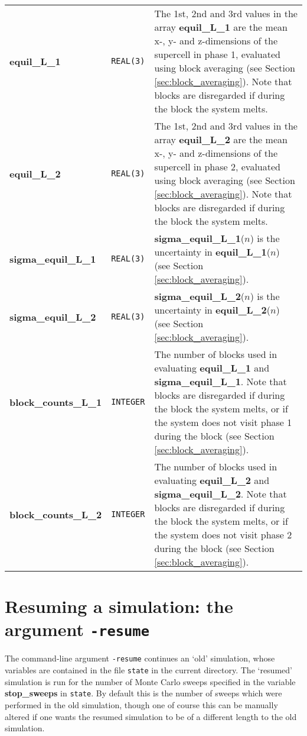 \documentclass{report}
\begin{document}
\begin{landscape}
\begin{center}
\begin{longtable}{ l l p{8cm}}
\textbf{equil\_L\_1} & \texttt{REAL(3)} & The 1st, 2nd and 3rd values in the array \textbf{equil\_L\_1} are the mean x-, y- and z-dimensions of the
supercell in phase 1, evaluated using block averaging (see Section \ref{sec:block_averaging}). Note that blocks are disregarded if during the block the system melts. \\
\textbf{equil\_L\_2} & \texttt{REAL(3)} &  The 1st, 2nd and 3rd values in the array \textbf{equil\_L\_2} are the mean x-, y- and z-dimensions of the
supercell in phase 2, evaluated using block averaging (see Section \ref{sec:block_averaging}). Note that blocks are disregarded if during the block the system melts. \\
\textbf{sigma\_equil\_L\_1} & \texttt{REAL(3)} & \textbf{sigma\_equil\_L\_1}($n$) is the uncertainty in \textbf{equil\_L\_1}($n$) (see Section \ref{sec:block_averaging}). \\
\textbf{sigma\_equil\_L\_2} & \texttt{REAL(3)} & \textbf{sigma\_equil\_L\_2}($n$) is the uncertainty in \textbf{equil\_L\_2}($n$) (see Section \ref{sec:block_averaging}). \\
\textbf{block\_counts\_L\_1} & \texttt{INTEGER} & The number of blocks used in evaluating \textbf{equil\_L\_1} and \textbf{sigma\_equil\_L\_1}. Note that blocks are
disregarded if during the block the system melts, or if the system does not visit phase 1 during the block  (see Section \ref{sec:block_averaging}). \\
\textbf{block\_counts\_L\_2} & \texttt{INTEGER} &  The number of blocks used in evaluating \textbf{equil\_L\_2} and \textbf{sigma\_equil\_L\_2}. Note that blocks are
disregarded if during the block the system melts, or if the system does not visit phase 2 during the block (see Section \ref{sec:block_averaging}). \\
\end{longtable}
\end{center}
\end{landscape}


\section{Resuming a simulation: the argument \texttt{-resume}}\label{sec:resume}
The command-line argument \texttt{-resume} continues an `old' simulation, whose variables are contained in the file \texttt{state} in the current 
directory. The `resumed' simulation is run for the number of Monte Carlo sweeps specified in the variable \textbf{stop\_sweeps} in \texttt{state}.
By default this is the number of sweeps which were performed in the old simulation, though one of course this can be manually altered if one wants
the resumed simulation to be of a different length to the old simulation.
\end{document}
